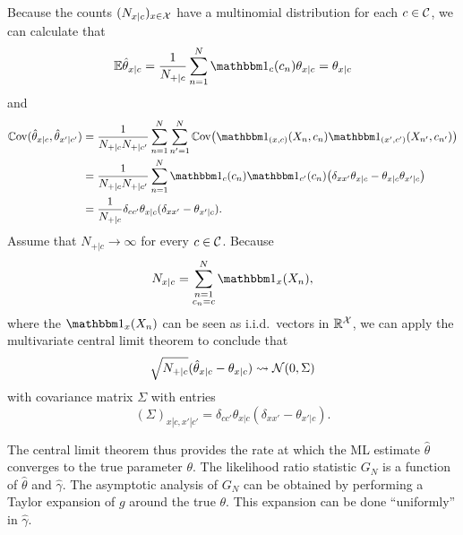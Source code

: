 Because the counts $(N_{x|c})_{x\in\mathcal{X}}$ have a multinomial distribution for each $c\in\mathcal{C}$, we can calculate that
$$\Exp \hat\theta_{x|c} = \frac{1}{N_{+|c}} \sum_{n=1}^N \I_c(c_n) \theta_{x|c} = \theta_{x|c}$$
and
\begin{equation*}\begin{split}
  \Cov(\hat \theta_{x|c}, \hat \theta_{x'|c'}) 
  & = \frac{1}{N_{+|c} N_{+|c'}} \sum_{n=1}^N \sum_{n'=1}^N \Cov\big( \I_{(x,c)}(X_n,c_n) \I_{(x',c')}(X_{n'},c_{n'}) \big) \\
  & = \frac{1}{N_{+|c} N_{+|c'}} \sum_{n=1}^N \I_c(c_n) \I_{c'}(c_{n}) \big( \delta_{xx'} \theta_{x|c} - \theta_{x|c} \theta_{x'|c} \big) \\
  & = \frac{1}{N_{+|c}} \delta_{cc'} \theta_{x|c} (\delta_{xx'} - \theta_{x'|c}).
\end{split}\end{equation*}
Assume that $N_{+|c} \to \infty$ for every $c \in \mathcal{C}$.
Because
  $$N_{x|c} = \sum_{\substack{n=1 \\ c_n=c}}^N \I_{x}(X_n),$$
where the $\I_{x}(X_n)$ can be seen as i.i.d.\ vectors in $\mathbb{R}^{\mathcal{X}}$, we can apply the multivariate
central limit theorem to conclude that
  \begin{equation}\label{eq:multinomial_clt}
    \sqrt{N_{+|c}} (\hat\theta_{x|c} - \theta_{x|c}) \leadsto \mathcal{N}(0,\Sigma)
  \end{equation}
with covariance matrix $\Sigma$ with entries
  \begin{equation}\label{eq:multinomial_cov}
    (\Sigma)_{x|c,x'|c'} = \delta_{cc'} \theta_{x|c} (\delta_{xx'} - \theta_{x'|c}).
  \end{equation}

The central limit theorem thus provides the rate at which the ML estimate $\hat \theta$ converges to the true parameter $\theta$.
The likelihood ratio statistic $G_N$ is a function of $\hat \theta$ and $\hat\gamma$. 
The asymptotic analysis of $G_N$ can be obtained by performing a Taylor expansion of $g$ around the true $\theta$. 
This expansion can be done ``uniformly'' in $\hat\gamma$.

